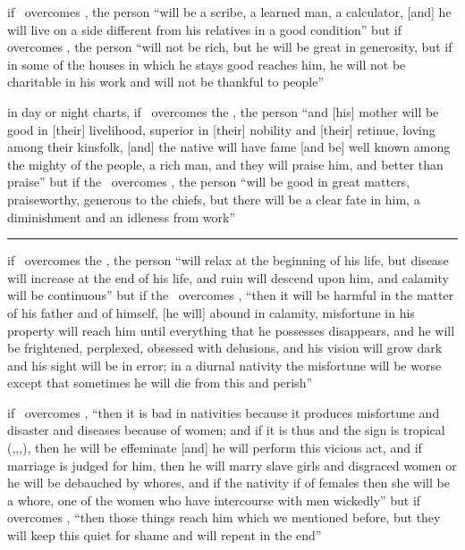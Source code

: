 \begin{description}[style=multiline,leftmargin=1.5cm]
\item[\Jupiter\Square\Mercury] if \Jupiter\, overcomes \Mercury, the person ``will be a scribe, a learned man, a calculator, [and] he will live on a side different from his relatives in a good condition'' but if \Mercury\, overcomes \Jupiter, the person ``will not be rich, but he will be great in generosity, but if in some of the houses in which he stays good reaches him, he will not be charitable in his work and will not be thankful to people''

\item[\Jupiter\Square\Moon] in day or night charts, if \Jupiter\, overcomes the \Moon, the person ``and [his] mother will be good in [their] livelihood, superior in [their] nobility and [their] retinue, loving among their kinsfolk, [and] the native will have fame [and be] well known among the mighty of the people, a rich man, and they will praise him, and better than praise'' but if the \Moon\, overcomes \Jupiter, the person ``will be good in great matters, praiseworthy, generous to the chiefs, but there will be a clear fate in him, a diminishment and an idleness from work''

\vspace{0.5em}\hrule
\item[\Mars\Square\Sun] if \Mars\, overcomes the \Sun, the person ``will relax at the beginning of his life, but disease will increase at the end of his life, and ruin will descend upon him, and calamity will be continuous'' but if the \Sun\, overcomes \Mars, ``then it will be harmful in the matter of his father and of himself, [he will] abound in calamity, misfortune in his property will reach him until everything that he possesses disappears, and he will be frightened, perplexed, obsessed with delusions, and his vision will grow dark and his sight will be in error; in a diurnal nativity the misfortune will be worse except that sometimes he will die from this and perish''

\item[\Mars\Square\Venus] if \Mars\, overcomes \Venus, ``then it is bad in nativities because it produces misfortune and disaster and diseases because of women; and if it is thus and the sign is tropical (\Aries,\Cancer,\Libra,\Capricorn), then he will be effeminate [and] he will perform this vicious act, and if marriage is judged for him, then he will marry slave girls and disgraced women or he will be debauched by whores, and if the nativity if of females then she will be a whore, one of the women who have intercourse with men wickedly'' but if \Venus\, overcomes \Mars, ``then those things reach him which we mentioned before, but they will keep this quiet for shame and will repent in the end''


\end{description}
